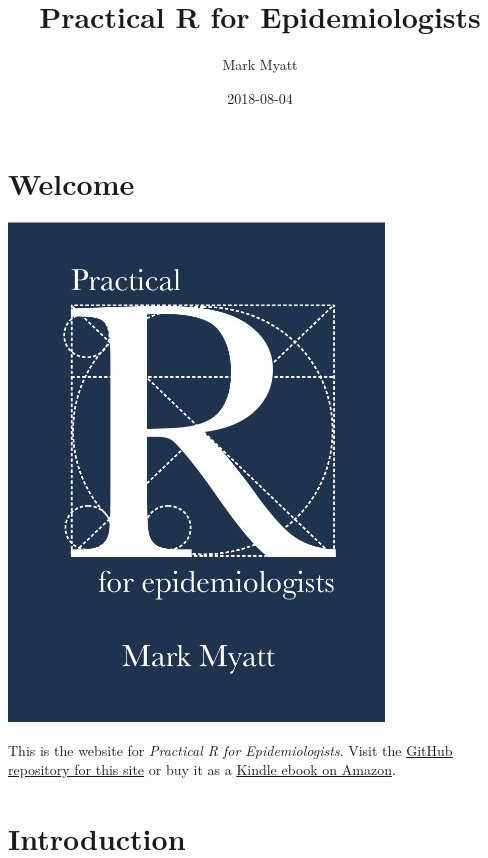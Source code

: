 \documentclass[12pt,a4paper]{book}
\title{Practical R for Epidemiologists}
\author{Mark Myatt}
\date{2018-08-04}
\theoremstyle{definition}
\theoremstyle{definition}
\theoremstyle{definition}
\theoremstyle{remark}
\begin{document}
\maketitle

{
\hypersetup{linkcolor=black}
\setcounter{tocdepth}{1}
\tableofcontents
}
\hypertarget{welcome}{%
\chapter*{Welcome}\label{welcome}}

\includegraphics{images/bookcover.jpg}

This is the website for \emph{Practical R for Epidemiologists}. Visit
the
\href{https://github.com/ernestguevarra/practical-r-for-epidemiologists}{GitHub
repository for this site} or buy it as a
\href{https://www.amazon.co.uk/Practical-R-Epidemiologists-Mark-Myatt-ebook/dp/B00DQATKIE/ref=sr_1_1?ie=UTF8\&qid=1524423427\&sr=8-1\&keywords=practical+r+for+epidemiologists}{Kindle
ebook on Amazon}.

\hypertarget{introduction}{%
\chapter*{Introduction}\label{introduction}}
\end{document}
